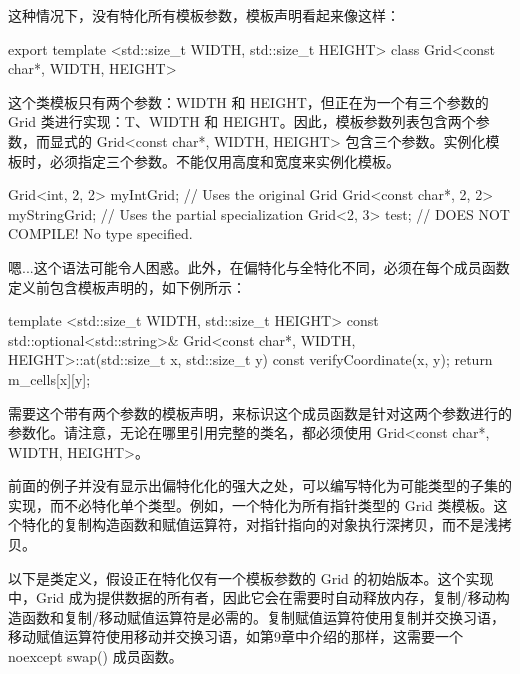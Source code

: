 这种情况下，没有特化所有模板参数，模板声明看起来像这样：

\begin{cpp}
export template <std::size_t WIDTH, std::size_t HEIGHT>
class Grid<const char*, WIDTH, HEIGHT>
\end{cpp}

这个类模板只有两个参数：WIDTH 和 HEIGHT，但正在为一个有三个参数的 Grid 类进行实现：T、WIDTH 和 HEIGHT。因此，模板参数列表包含两个参数，而显式的 Grid<const char*, WIDTH, HEIGHT> 包含三个参数。实例化模板时，必须指定三个参数。不能仅用高度和宽度来实例化模板。

\begin{cpp}
Grid<int, 2, 2> myIntGrid; // Uses the original Grid
Grid<const char*, 2, 2> myStringGrid; // Uses the partial specialization
Grid<2, 3> test; // DOES NOT COMPILE! No type specified.
\end{cpp}

嗯...这个语法可能令人困惑。此外，在偏特化与全特化不同，必须在每个成员函数定义前包含模板声明的，如下例所示：

\begin{cpp}
template <std::size_t WIDTH, std::size_t HEIGHT>
const std::optional<std::string>&
    Grid<const char*, WIDTH, HEIGHT>::at(std::size_t x, std::size_t y) const
{
    verifyCoordinate(x, y);
    return m_cells[x][y];
}
\end{cpp}

需要这个带有两个参数的模板声明，来标识这个成员函数是针对这两个参数进行的参数化。请注意，无论在哪里引用完整的类名，都必须使用 Grid<const char*, WIDTH, HEIGHT>。

前面的例子并没有显示出偏特化化的强大之处，可以编写特化为可能类型的子集的实现，而不必特化单个类型。例如，一个特化为所有指针类型的 Grid 类模板。这个特化的复制构造函数和赋值运算符，对指针指向的对象执行深拷贝，而不是浅拷贝。

以下是类定义，假设正在特化仅有一个模板参数的 Grid 的初始版本。这个实现中，Grid 成为提供数据的所有者，因此它会在需要时自动释放内存，复制/移动构造函数和复制/移动赋值运算符是必需的。复制赋值运算符使用复制并交换习语，移动赋值运算符使用移动并交换习语，如第9章中介绍的那样，这需要一个 noexcept swap() 成员函数。

